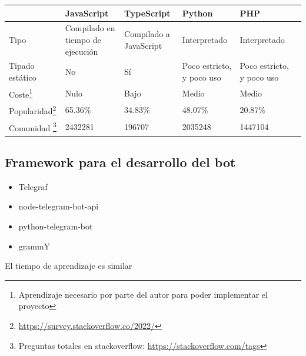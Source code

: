 \begin{minipage}{\textwidth}
\begin{tabularx}{\textwidth}{|l|X|X|X|X|}
\hline
                                                    & JavaScript                       & TypeScript             & Python                    & PHP                       \\
\hline
Tipo                                                & Compilado en tiempo de ejecución & Compilado a JavaScript & Interpretado              & Interpretado              \\
\hline
Tipado estático                                     & No                               & Sí                     & Poco estricto, y poco uso & Poco estricto, y poco uso \\
\hline
Coste\footnote{Aprendizaje necesario por parte del autor para poder implementar el proyecto}                                & Nulo                             & Bajo                   & Medio                     & Medio                     \\
\hline
Popularidad\footnote{\url{https://survey.stackoverflow.co/2022/}} & 65.36\%                          & 34.83\%                & 48.07\%                   & 20.87\%                   \\
\hline
Comunidad \footnote{Preguntas totales en stackoverflow: \url{https://stackoverflow.com/tags}}      & 2432281                          & 196707                 & 2035248                   & 1447104                  &
\hline
\end{tabularx}
\end{minipage}

\subsection{Framework para el desarrollo del bot}
\begin{itemize}
    \item Telegraf
    \item node-telegram-bot-api
    \item python-telegram-bot
    \item grammY
\end{itemize}

El tiempo de aprendizaje es similar 

